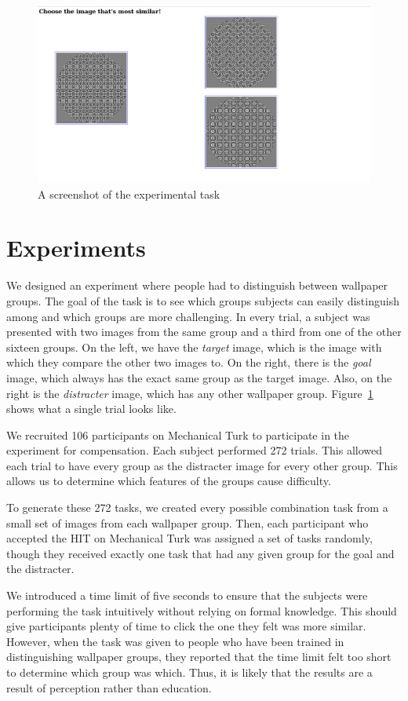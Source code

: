 \begin{figure}[!ht]
\centering
\includegraphics[width=0.9\columnwidth]{symper}
\caption{A screenshot of the experimental task}
\label{screenshot}
\end{figure}

\section{Experiments}
We designed an experiment where people had to distinguish between wallpaper groups. The goal of the task is to see which groups subjects can easily distinguish among and which groups are more challenging. In every trial, a subject was presented with two images from the same group and a third from one of the other sixteen groups. On the left, we have the \textit{target} image, which is the image with which they compare the other two images to. On the right, there is the \textit{goal} image, which always has the exact same group as the target image. Also, on the right is the \textit{distracter} image, which has any other wallpaper group. Figure~\ref{screenshot} shows what a single trial looks like. 

We recruited 106 participants on Mechanical Turk to participate in the experiment for compensation. Each subject performed 272 trials. This allowed each trial to have every group as the distracter image for every other group. This allows us to determine which features of the groups cause difficulty.

To generate these 272 tasks, we created every possible combination task from a small set of images from each wallpaper group. Then, each participant who accepted the HIT on Mechanical Turk was assigned a set of tasks randomly, though they received exactly one task that had any given group for the goal and the distracter.

We introduced a time limit of five seconds to ensure that the subjects were performing the task intuitively without relying on formal knowledge. This should give participants plenty of time to click the one they felt was more similar. However, when the task was given to people who have been trained in distinguishing wallpaper groups, they reported that the time limit felt too short to determine which group was which. Thus, it is likely that the results are a result of perception rather than education.

